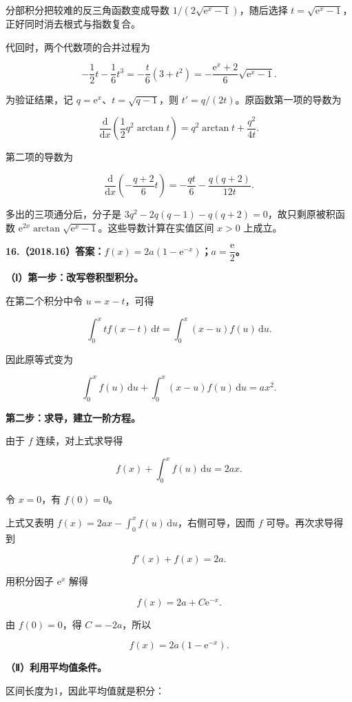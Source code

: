 \documentclass[UTF8,11pt,fontset=windows]{ctexart}
\begin{document}
分部积分把较难的反三角函数变成导数 $1/(2\sqrt{\mathrm e^x-1})$，随后选择 $t=\sqrt{\mathrm e^x-1}$，正好同时消去根式与指数复合。

代回时，两个代数项的合并过程为

$$
-\frac12t-\frac16t^3
=-\frac{t}{6}(3+t^2)
=-\frac{\mathrm e^x+2}{6}\sqrt{\mathrm e^x-1}.
$$

为验证结果，记 $q=\mathrm e^x$、$t=\sqrt{q-1}$，则 $t'=q/(2t)$。原函数第一项的导数为

$$
\frac{\mathrm d}{\mathrm dx}\left(\frac12q^2\arctan t\right)
=q^2\arctan t+\frac{q^2}{4t}.
$$

第二项的导数为

$$
\frac{\mathrm d}{\mathrm dx}\left(-\frac{q+2}{6}t\right)
=-\frac{qt}{6}-\frac{q(q+2)}{12t}.
$$

多出的三项通分后，分子是 $3q^2-2q(q-1)-q(q+2)=0$，故只剩原被积函数 $\mathrm e^{2x}\arctan\sqrt{\mathrm e^x-1}$。这些导数计算在实值区间 $x>0$ 上成立。

\clearpage

\textbf{16.（2018.16）答案：$f(x)=2a(1-\mathrm e^{-x})$；$a=\dfrac{\mathrm e}{2}$。}

\textbf{（Ⅰ）第一步：改写卷积型积分。}

在第二个积分中令 $u=x-t$，可得

$$
\int_0^x t f(x-t)\,\mathrm dt=\int_0^x(x-u)f(u)\,\mathrm du.
$$

因此原等式变为

$$
\int_0^x f(u)\,\mathrm du+\int_0^x(x-u)f(u)\,\mathrm du=ax^2.
$$

\textbf{第二步：求导，建立一阶方程。}

由于 $f$ 连续，对上式求导得

$$
f(x)+\int_0^x f(u)\,\mathrm du=2ax.
$$

令 $x=0$，有 $f(0)=0$。

上式又表明 $f(x)=2ax-\int_0^x f(u)\,\mathrm du$，右侧可导，因而 $f$ 可导。再次求导得到

$$
f'(x)+f(x)=2a.
$$

用积分因子 $\mathrm e^x$ 解得

$$
f(x)=2a+C\mathrm e^{-x}.
$$

由 $f(0)=0$，得 $C=-2a$，所以

$$
f(x)=2a(1-\mathrm e^{-x}).
$$

\textbf{（Ⅱ）利用平均值条件。}

区间长度为1，因此平均值就是积分：
\end{document}
